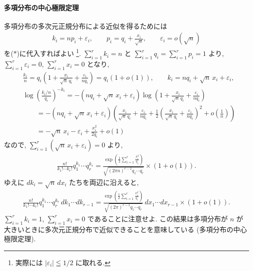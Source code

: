 \documentclass[12pt,twoside]{jarticle}
\newcommand\eps{\varepsilon}
\theoremstyle{jplain}
\theoremstyle{jplain}
\theoremstyle{jplain}
\numberwithin{theorem}{section}
\numberwithin{equation}{section}
\numberwithin{figure}{section}
\numberwithin{table}{section}
\begin{document}
\paragraph{多項分布の中心極限定理}
多項分布の多次元正規分布による近似を得るためには
\begin{align*}
k_i = np_i + \eps_i, \qquad
p_i = q_i + \frac{x_i}{\sqrt{n}}, \qquad
\eps_i = o(\sqrt{n})
\end{align*}
を($*$)に代入すればよい%
\footnote{実際には $|\eps_i|\leqq 1/2$ に取れる.}. 
$\sum_{i=1}^r k_i=n$ と $\sum_{i=1}^r q_i=\sum_{i=1}^r p_i=1$ より, 
$\sum_{i=1}^r \eps_i=0$, $\sum_{i=1}^r x_i=0$ となり,
\begin{align*}
&
\frac{k_i}{n}
=q_i\left(1+\frac{x_i}{\sqrt{n}\,q_i}+\frac{\eps_i}{nq_i}\right)
=q_i(1+o(1)),
\qquad
k_i = nq_i + \sqrt{n}\,x_i+\eps_i,
\\ &
\log\left(\frac{k_i/n}{q_i}\right)^{-k_i}
=-(nq_i+\sqrt{n}\,x_i+\eps_i)
\log\left(1+\frac{x_i}{\sqrt{n}\,q_i}+\frac{\eps_i}{nq_i}\right)
\\ & \qquad
=-(nq_i+\sqrt{n}\,x_i+\eps_i)
\left(
  \frac{x_i}{\sqrt{n}\,q_i}+\frac{\eps_i}{nq_i}
 +\frac{1}{2}
  \left(\frac{x_i}{\sqrt{n}\,q_i}+\frac{\eps_i}{nq_i}\right)^2
 +o\left(\frac{1}{n}\right)
\right)
\\ & \qquad
=-\sqrt{n}\,x_i-\eps_i+\frac{x_i^2}{2q_i}+o(1)
\end{align*}
なので, $\sum_{i=1}^r(\sqrt{n}\,x_i+\eps_i)=0$ より, 
\begin{align*}
\frac{n!}{k_1!\cdots k_r!}q_1^{k_1}\cdots q_r^{k_r}
=
\frac
{\displaystyle\exp\left(\frac{1}{2}\sum_{i=1}^r\frac{x_i^2}{q_i}\right)}
{\sqrt{(2\pi n)^{r-1}q_1\cdots q_r}}
\times(1+o(1)).
\end{align*}
ゆえに $dk_i=\sqrt{n}\,dx_i$ たちを両辺に沿えると, 
\begin{align*}
\frac{n!}{k_1!\cdots k_r!}q_1^{k_1}\cdots q_r^{k_r}
\,dk_1\cdots dk_{r-1}
=
\frac
{\displaystyle\exp\left(\frac{1}{2}\sum_{i=1}^r\frac{x_i^2}{q_i}\right)}
{\sqrt{(2\pi)^{r-1}q_1\cdots q_r}}
\,dx_1\cdots dx_{r-1}
\times(1+o(1)).
\end{align*}
$\sum_{i=1}^r k_i=1$, $\sum_{i=1}^r x_i=0$ であることに注意せよ.
この結果は多項分布が $n$ が大きいときに多次元正規分布で近似できることを意味している
(多項分布の中心極限定理).
\end{document}
